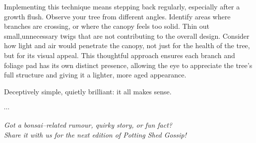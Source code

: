 Implementing this technique means stepping back regularly, especially after a growth flush.
Observe your tree from different angles.
Identify areas where branches are crossing, or where the canopy feels too solid.
Thin out small,unnecessary twigs that are not contributing to the overall design.
Consider how light and air would penetrate the canopy, not just for the health of the tree, but for its visual appeal.
This thoughtful approach ensures each branch and foliage pad has its own distinct presence, allowing the eye to appreciate the tree's full structure and giving it a lighter, more aged appearance.


Deceptively simple, quietly brilliant: it all makes sense. %

\begin{center}
$\cdots$
\end{center}

\noindent
\textit{Got a bonsai--related rumour, quirky story, or fun fact?}\\
\textit{Share it with us for the next edition of \textit{Potting Shed Gossip}!}
\closearticle

\columnbreak
